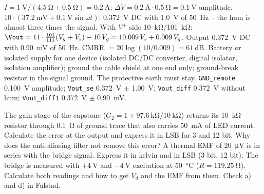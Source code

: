 \begin{solution}
\begin{talist}
\ta $I = \SI{1}{\volt}/(\SI{4.5}{\ohm} + \SI{0.5}{\ohm}) = \SI{0.2}{\ampere}$; $\Delta V = \SI{0.2}{\ampere}\cdot\SI{0.5}{\ohm} = \SI{0.1}{\volt}$ amplitude.
\ta $10\cdot(\SI{37.2}{\milli\volt} + \SI{0.1}{\volt}\sin\omega t)$: \SI{0.372}{\volt} DC with \SI{1.0}{\volt} of \SI{50}{\hertz} -- the hum is almost three times the signal.
\ta With $V^+$ side \SI{10}{\kilo\ohm}/\SI{101}{\kilo\ohm}: $\Vout = 11\cdot\frac{101}{111}(V_g + V_s) - 10\,V_g = 10.009\,V_s + 0.009\,V_g$.
	Output \SI{0.372}{\volt} DC with \SI{0.90}{\milli\volt} of \SI{50}{\hertz}. CMRR $= 20\log(10/0.009) = \SI{61}{\deci\bel}$.
\ta Battery or isolated supply for one device (isolated DC/DC converter, digital isolator, isolation amplifier); ground the
	cable shield at one end only; ground-break resistor in the signal ground. The protective earth must stay.
\ta {}\newline \texttt{GND\_remote} \SI{0.100}{\volt} amplitude; \texttt{Vout\_se} \SI{0.372}{\volt} $\pm$ \SI{1.00}{\volt};
	\texttt{Vout\_diff} \SI{0.372}{\volt} without hum; \texttt{Vout\_diff1} \SI{0.372}{\volt} $\pm$ \SI{0.90}{\milli\volt}.
\end{talist}
\end{solution}

\label{ex:noise-ground}
\begin{talist}
\ta The gain stage of the capstone ($G_2 = 1 + \SI{97.6}{\kilo\ohm}/\SI{10}{\kilo\ohm}$) returns its \SI{10}{\kilo\ohm} resistor through
	\SI{0.1}{\ohm} of ground trace that also carries \SI{50}{\milli\ampere} of LED current. Calculate the error at the output and express it in LSB for 3 and 12 bit.
\ta Why does the anti-aliasing filter not remove this error?
\ta A thermal EMF of \SI{20}{\micro\volt} is in series with the bridge signal. Express it in kelvin and in LSB (3 bit, 12 bit).
\ta The bridge is measured with $+\SI{4}{\volt}$ and $-\SI{4}{\volt}$ excitation at \SI{50}{\celsius} ($R = \SI{119.25}{\ohm}$). Calculate both readings and how to get $V_d$ and the EMF from them.
\ta Check a) and d) in Falstad.
\end{talist}

